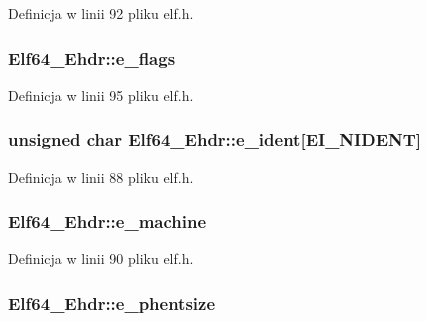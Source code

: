 Definicja w linii 92 pliku elf.\-h.

\hypertarget{struct_elf64___ehdr_ae6ea9e821472d35e7d2c446fa79bdc3a}{
\subsubsection[{e\-\_\-flags}]{ Elf64\-\_\-\-Ehdr\-::e\-\_\-flags}}\label{struct_elf64___ehdr_ae6ea9e821472d35e7d2c446fa79bdc3a}


Definicja w linii 95 pliku elf.\-h.

\hypertarget{struct_elf64___ehdr_acdd2e122af003c5b5708d1ae75b4a85c}{
\subsubsection[{e\-\_\-ident}]{\setlength{\rightskip}{0pt plus 5cm}unsigned char Elf64\-\_\-\-Ehdr\-::e\-\_\-ident\mbox{[}{\bf E\-I\-\_\-\-N\-I\-D\-E\-N\-T}\mbox{]}}}\label{struct_elf64___ehdr_acdd2e122af003c5b5708d1ae75b4a85c}


Definicja w linii 88 pliku elf.\-h.

\hypertarget{struct_elf64___ehdr_adecc8b3641e23794f39c78f15ab8c809}{
\subsubsection[{e\-\_\-machine}]{ Elf64\-\_\-\-Ehdr\-::e\-\_\-machine}}\label{struct_elf64___ehdr_adecc8b3641e23794f39c78f15ab8c809}


Definicja w linii 90 pliku elf.\-h.

\hypertarget{struct_elf64___ehdr_ab5aefb7a14b9cf2eafcbaf0664852369}{
\subsubsection[{e\-\_\-phentsize}]{ Elf64\-\_\-\-Ehdr\-::e\-\_\-phentsize}}\label{struct_elf64___ehdr_ab5aefb7a14b9cf2eafcbaf0664852369}


